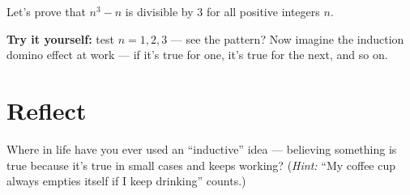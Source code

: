 \documentclass[12pt]{article}
\begin{document}
Let’s prove that $n^3 - n$ is divisible by 3 for all positive integers $n$.

\noindent \textbf{Try it yourself:} test $n=1, 2, 3$ — see the pattern?  
Now imagine the induction domino effect at work — if it’s true for one, it’s true for the next, and so on.

\section*{Reflect}

Where in life have you ever used an “inductive” idea —  
believing something is true because it’s true in small cases and keeps working?  
(\textit{Hint:} “My coffee cup always empties itself if I keep drinking” counts.)
\end{document}
